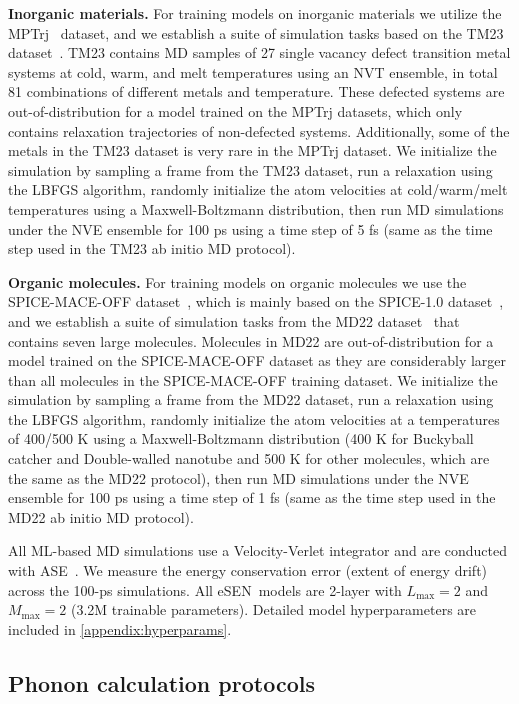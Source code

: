 \documentclass[twocolumn]{fairmeta}
\newcommand{\ourmodel}{eSEN}
\begin{document}
\textbf{Inorganic materials.} For training models on inorganic materials we utilize the MPTrj~\citep{deng2023chgnet} dataset, and we establish a suite of simulation tasks based on the TM23 dataset~\citep{owen2024complexity}. TM23  contains MD samples of 27 single vacancy defect transition metal systems at cold, warm, and melt temperatures using an NVT ensemble, in total 81 combinations of different metals and temperature. These defected systems are out-of-distribution for a model trained on the MPTrj datasets, which only contains relaxation trajectories of non-defected systems. Additionally, some of the metals in the TM23 dataset is very rare in the MPTrj dataset. We initialize the simulation by sampling a frame from the TM23 dataset, run a relaxation using the LBFGS algorithm, randomly initialize the atom velocities at cold/warm/melt temperatures using a Maxwell-Boltzmann distribution, then run MD simulations under the NVE ensemble for 100 ps using a time step of 5 fs (same as the time step used in the TM23 ab initio MD protocol). 

\textbf{Organic molecules.} For training models on organic molecules we use the SPICE-MACE-OFF dataset~\citep{kovacs2023mace}, which is mainly based on the SPICE-1.0 dataset~\citep{eastman2023spice}, and we establish a suite of simulation tasks from the MD22 dataset~\citep{chmiela2023accurate} that contains seven large molecules. Molecules in MD22 are out-of-distribution for a model trained on the SPICE-MACE-OFF dataset as they are considerably larger than all molecules in the SPICE-MACE-OFF training dataset. We initialize the simulation by sampling a frame from the MD22 dataset, run a relaxation using the LBFGS algorithm, randomly initialize the atom velocities at a temperatures of 400/500 K using a Maxwell-Boltzmann distribution (400 K for Buckyball catcher and Double-walled nanotube and 500 K for other molecules, which are the same as the MD22 protocol), then run MD simulations under the NVE ensemble for 100 ps using a time step of 1 fs (same as the time step used in the MD22 ab initio MD protocol). 

All ML-based MD simulations use a Velocity-Verlet integrator and are conducted with \textsc{ASE}~\citep{ase}. We measure the energy conservation error (extent of energy drift) across the 100-ps simulations. All \ourmodel\ models are 2-layer with $L_{\mathrm{max}}=2$ and $M_{\mathrm{max}}=2$ (3.2M trainable parameters). Detailed model hyperparameters are included in \cref{appendix:hyperparams}.

\subsection{Phonon calculation protocols}
\end{document}

